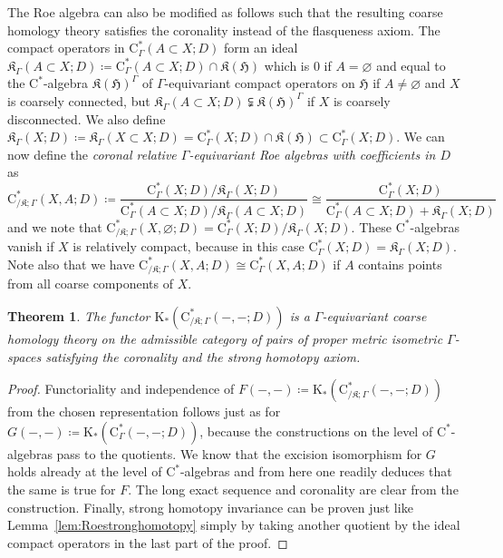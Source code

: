 \documentclass[pdftex]{sigma}
\numberwithin{equation}{section}
\newtheorem{thm}{Theorem}[section]
\theoremstyle{definition}
\newcommand{\HilbertMod}{\mathfrak{H}}
\newcommand{\K}{\mathrm{K}}
\newcommand{\textCstar}{\ensuremath{\mathrm{C}^*\!}}
\newcommand{\Roe}{\mathrm{C}^*}
\newcommand{\Kom}{{\mathfrak{K}}}
\newcommand{\blank}{-}
\begin{document}
The Roe algebra can also be modified as follows such that the resulting coarse homology theory satisfies the coronality instead of the flasqueness axiom.
The compact operators in $\Roe_\Gamma(A\subset X;D)$ form an ideal $\Kom_\Gamma(A\subset X;D)\coloneqq\Roe_\Gamma(A\subset X;D)\cap\Kom(\HilbertMod)$ which is $0$ if $A=\varnothing$ and equal to the \textCstar-algebra $\Kom(\HilbertMod)^\Gamma$ of $\Gamma$-equivariant compact operators on $\HilbertMod$ if $A\not=\varnothing$ and $X$ is coarsely connected, but $\Kom_\Gamma(A\subset X;D)\subsetneqq \Kom(\HilbertMod)^\Gamma$ if $X$ is coarsely disconnected. We also define $\Kom_\Gamma(X;D)\coloneqq\Kom_\Gamma(X\subset X;D)=\Roe_\Gamma(X;D)\cap\Kom(\HilbertMod)\subset \Roe_\Gamma(X;D)$.
We can now define the \emph{coronal relative $\Gamma$-equivariant Roe algebras with coefficients in $D$} as
\[
\Roe_{/\Kom;\Gamma}(X,A;D)\coloneqq\frac{\Roe_\Gamma(X;D)/\Kom_\Gamma(X;D)}{\Roe_\Gamma(A\subset X;D)/\Kom_\Gamma(A\subset X;D)}\cong \frac{\Roe_\Gamma(X;D)}{\Roe_\Gamma(A\subset X;D)+\Kom_\Gamma(X;D)}
\]
and we note that $\Roe_{/\Kom;\Gamma}(X,\varnothing;D)=\Roe_\Gamma(X;D)/\Kom_\Gamma(X;D)$.
These \textCstar-algebras vanish if $X$ is relatively compact, because in this case $\Roe_\Gamma(X;D)=\Kom_\Gamma(X;D)$.
Note also that we have $\Roe_{/\Kom;\Gamma}(X,A;D)\cong\Roe_\Gamma(X,A;D)$ if $A$ contains points from all coarse components of $X$.

\begin{thm}
The functor $\K_*(\Roe_{/\Kom;\Gamma}(\blank,\blank;D))$ is a $\Gamma$-equivariant coarse homology theory on the admissible category of pairs of proper metric isometric $\Gamma$-spaces satisfying the coronality and the strong homotopy axiom.
\end{thm}

\begin{proof}
Functoriality and independence of $F(\blank,\blank)\coloneqq \K_*(\Roe_{/\Kom;\Gamma}(\blank,\blank;D))$ from the chosen representation follows just as for $G(\blank,\blank)\coloneqq \K_*(\Roe_\Gamma(\blank,\blank;D))$, because the constructions on the level of \textCstar-algebras pass to the quotients.
We know that the excision isomorphism for $G$ holds already at the level of \textCstar-algebras and from here one readily deduces that the same is true for $F$.
The long exact sequence and coronality are clear from the construction.
Finally, strong homotopy invariance can be proven just like Lemma~\ref{lem:Roestronghomotopy} simply by taking another quotient by the ideal compact operators in the last part of the proof.
\end{proof}
\end{document}
